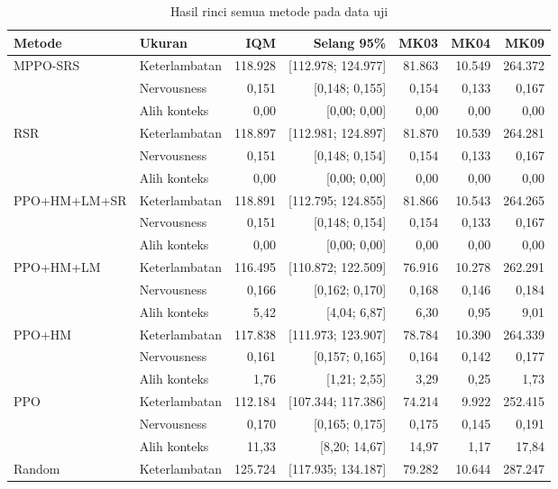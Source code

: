 \begin{table}[htbp]
\caption{Hasil rinci semua metode pada data uji}
\label{tab:lampiran_hasil_rinci}
\centering\scriptsize\setlength{\tabcolsep}{3pt}
\begin{tabular}{llrrrrr}
\toprule
Metode & Ukuran & IQM & Selang 95\% & MK03 & MK04 & MK09 \\
\midrule
MPPO-SRS & Keterlambatan & 118.928 & [112.978; 124.977] & 81.863 & 10.549 & 264.372 \\
 & Nervousness & 0,151 & [0,148; 0,155] & 0,154 & 0,133 & 0,167 \\
 & Alih konteks & 0,00 & [0,00; 0,00] & 0,00 & 0,00 & 0,00 \\
\addlinespace
RSR & Keterlambatan & 118.897 & [112.981; 124.897] & 81.870 & 10.539 & 264.281 \\
 & Nervousness & 0,151 & [0,148; 0,154] & 0,154 & 0,133 & 0,167 \\
 & Alih konteks & 0,00 & [0,00; 0,00] & 0,00 & 0,00 & 0,00 \\
\addlinespace
PPO+HM+LM+SR & Keterlambatan & 118.891 & [112.795; 124.855] & 81.866 & 10.543 & 264.265 \\
 & Nervousness & 0,151 & [0,148; 0,154] & 0,154 & 0,133 & 0,167 \\
 & Alih konteks & 0,00 & [0,00; 0,00] & 0,00 & 0,00 & 0,00 \\
\addlinespace
PPO+HM+LM & Keterlambatan & 116.495 & [110.872; 122.509] & 76.916 & 10.278 & 262.291 \\
 & Nervousness & 0,166 & [0,162; 0,170] & 0,168 & 0,146 & 0,184 \\
 & Alih konteks & 5,42 & [4,04; 6,87] & 6,30 & 0,95 & 9,01 \\
\addlinespace
PPO+HM & Keterlambatan & 117.838 & [111.973; 123.907] & 78.784 & 10.390 & 264.339 \\
 & Nervousness & 0,161 & [0,157; 0,165] & 0,164 & 0,142 & 0,177 \\
 & Alih konteks & 1,76 & [1,21; 2,55] & 3,29 & 0,25 & 1,73 \\
\addlinespace
PPO & Keterlambatan & 112.184 & [107.344; 117.386] & 74.214 & 9.922 & 252.415 \\
 & Nervousness & 0,170 & [0,165; 0,175] & 0,175 & 0,145 & 0,191 \\
 & Alih konteks & 11,33 & [8,20; 14,67] & 14,97 & 1,17 & 17,84 \\
\addlinespace
Random & Keterlambatan & 125.724 & [117.935; 134.187] & 79.282 & 10.644 & 287.247 \\

\end{tabular}
\end{table}
